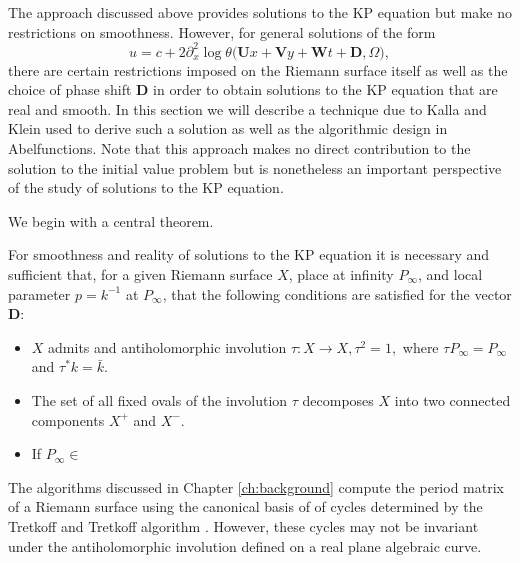 
The approach discussed above provides solutions to the KP equation but make no
restrictions on smoothness. However, for general solutions of the form
\begin{equation} \label{eqn:kp}
  u = c + 2 \partial_x^2 \log \theta\Big(
  \boldsymbol{U}x + \boldsymbol{V}y + \boldsymbol{W}t + \boldsymbol{D},
  \Omega \Big),
\end{equation}
there are certain restrictions imposed on the Riemann surface itself as well as
the choice of phase shift $\boldsymbol{D}$ in order to obtain solutions to the
KP equation that are real and smooth. In this section we will describe a
technique due to Kalla and Klein used to derive such a solution as well as the
algorithmic design in Abelfunctions. Note that this approach makes no direct
contribution to the solution to the initial value problem but is nonetheless an
important perspective of the study of solutions to the KP equation.

We begin with a central theorem.
\begin{theorem} \cite{belokolos1994algebro} For smoothness and reality of
  solutions to the KP equation it is necessary and sufficient that, for a given
  Riemann surface $X$, place at infinity $P_\infty$, and local parameter $p =
  k^{-1}$ at $P_\infty$, that the following conditions are satisfied for the
  vector $\boldsymbol{D}$:
  \begin{itemize}
  \item $X$ admits and antiholomorphic involution $\tau : X \to X, \tau^2 = 1,$
    where $\tau P_\infty = P_\infty$ and $\tau^* k = \bar{k}$.
  \item The set of all fixed ovals of the involution $\tau$ decomposes $X$ into
    two connected components $X^+$ and $X^-$.
  \item If $P_\infty \in $
    
  \end{itemize}

\end{theorem}

The algorithms discussed in Chapter \ref{ch:background} compute the period
matrix of a Riemann surface using the canonical basis of of cycles determined by
the Tretkoff and Tretkoff algorithm \cite{TretkoffTretkoff84}. However, these
cycles may not be invariant under the antiholomorphic involution defined on a
real plane algebraic curve.

